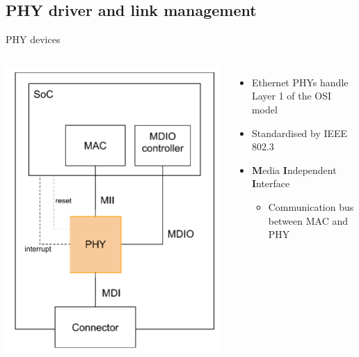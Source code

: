 \subsection{PHY driver and link management}

\begin{frame}{PHY devices}
	\begin{columns}
		\includegraphics[width=\textwidth]{slides/networking-driver-phy/phy_easy.pdf}
		\begin{itemize}
			\item Ethernet PHYs handle Layer 1 of the OSI model
			\item Standardised by IEEE 802.3
			\item \textbf{M}edia \textbf{I}ndependent \textbf{I}nterface
				\begin{itemize}
					\item Communication bus between MAC and PHY
				\end{itemize}

\end{itemize}
\end{columns}
\end{frame}
